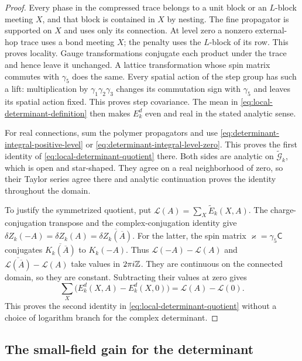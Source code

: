 \begin{proof}
Every phase in the compressed trace belongs to a unit block or an
$L$-block meeting $X$, and that block is contained in $X$ by
nesting. The fine propagator is supported on $X$ and uses only its
connection. At level zero a nonzero external-hop trace uses a bond
meeting $X$; the penalty uses the $L$-block of its row. This proves
locality. Gauge transformations conjugate each product under the
trace and hence leave it unchanged. A lattice transformation whose
spin matrix commutes with $\gamma_5$ does the same. Every spatial
action of the step group has such a lift: multiplication by
$\gamma_1\gamma_2\gamma_3$ changes its commutation sign with
$\gamma_5$ and leaves its spatial action fixed. This proves step
covariance. The mean in \eqref{eq:local-determinant-definition}
then makes $E_k^d$ even and real in the stated analytic sense.

For real connections, sum the polymer propagators and use
\eqref{eq:determinant-integral-positive-level} or
\eqref{eq:determinant-integral-level-zero}. This proves the first
identity of \eqref{eq:local-determinant-quotient} there. Both sides
are analytic on $\widetilde{\mathcal G}_k$, which is open and
star-shaped. They agree on a real neighborhood of zero, so their
Taylor series agree there and analytic continuation proves the
identity throughout the domain.

To justify the symmetrized quotient, put
$\mathcal L(A)=\sum_X\widetilde E_k(X,A)$.
The charge-conjugation transpose and the complex-conjugation
identity give
$\delta Z_k(-A)=\delta Z_k(A)
=\overline{\delta Z_k(\overline A)}$.
For the latter, the spin matrix $\varkappa=\gamma_5\mathsf C$
conjugates $\overline{K_k(\overline A)}$ to $K_k(-A)$.
Thus $\mathcal L(-A)-\mathcal L(A)$ and
$\overline{\mathcal L(\overline A)}-\mathcal L(A)$ take values
in $2\pi i\mathbb Z$. They are continuous on the connected domain,
so they are constant. Subtracting their values at zero gives
\[
 \sum_X\bigl(E_k^d(X,A)-E_k^d(X,0)\bigr)
                            =\mathcal L(A)-\mathcal L(0).
\]
This proves the second identity in
\eqref{eq:local-determinant-quotient} without a choice of logarithm
branch for the complex determinant.
\end{proof}

\subsection{The small-field gain for the determinant}\label{subsec:determinant-small-field-gain}

